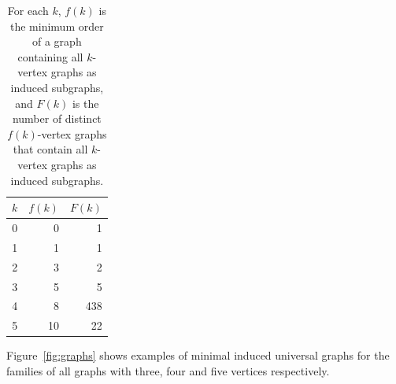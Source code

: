 \documentclass[12pt]{article}
\begin{document}
\begin{table}[h!]
\centering
\begin{tabular}{r r r}
 \toprule
 $k$ & $f(k)$ & $F(k)$ \\ [0.5ex]
 \midrule
 0 & 0 & 1 \\
 1 & 1 & 1 \\
 2 & 3 & 2 \\
 3 & 5 & 5 \\
 4 & 8 & 438 \\
 5 & 10 & 22 \\
 \bottomrule
\end{tabular}
\caption{For each $k$, $f(k)$ is the minimum order of a graph containing all $k$-vertex graphs as
induced subgraphs, and $F(k)$ is the number of distinct $f(k)$-vertex graphs that contain
all $k$-vertex graphs as induced subgraphs.}
\label{tab:graphresults}
\end{table}
%
%

Figure~\ref{fig:graphs} shows examples of minimal induced universal graphs
for the families of all graphs with three, four and five vertices
respectively.
\end{document}

